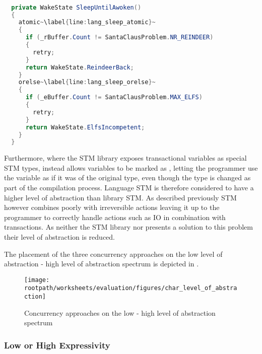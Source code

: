 \begin{lstlisting}[label=lst:lang_SleepUntilAwoken,
  caption={\bscode{SleepUntilAwoken} Method - \ac{STM} Language},
  language=Java,  
  showspaces=false,
  showtabs=false,
  breaklines=true,
  showstringspaces=false,
  breakatwhitespace=true,
  escapechar=~,
  commentstyle=\color{greencomments},
  keywordstyle=\color{bluekeywords},
  stringstyle=\color{redstrings},
  morekeywords={atomic, retry, orelse, var, get, set, ref, out}]  % Start your code-block

  private WakeState SleepUntilAwoken()
  {
    atomic~\label{line:lang_sleep_atomic}~
    {
      if (_rBuffer.Count != SantaClausProblem.NR_REINDEER)
      {
        retry;
      }
      return WakeState.ReindeerBack;
    }
    orelse~\label{line:lang_sleep_orelse}~
    {
      if (_eBuffer.Count != SantaClausProblem.MAX_ELFS)
      {
        retry;
      }
      return WakeState.ElfsIncompetent;
    }
  }
\end{lstlisting}

 Furthermore, where the \ac{STM} library exposes transactional variables as special \ac{STM} types, \stmnamesp instead allows variables to be marked as , letting the programmer use the variable as if it was of the original type, even though the type is changed as part of the compilation process. Language \ac{STM} is therefore considered to have a higher level of abstraction than library \ac{STM}. As described previously \ac{STM} however combines poorly with irreversible actions leaving it up to the programmer to correctly handle actions such as \ac{IO} in combination with transactions. As neither the \ac{STM} library nor \stmnamesp presents a solution to this problem their level of abstraction is reduced.

The placement of the three concurrency approaches on the low level of abstraction - high level of abstraction spectrum is depicted in . 

\begin{figure}[htbp]
\centering
 \texttt{[image: \\rootpath/worksheets/evaluation/figures/char\_level\_of\_abstraction]} 
 \caption{Concurrency approaches on the low - high level of abstraction spectrum}
\label{fig:char_level_of_abstraction}
\end{figure}

\subsubsection{Low or High Expressivity}\label{subsec:expressivity}

